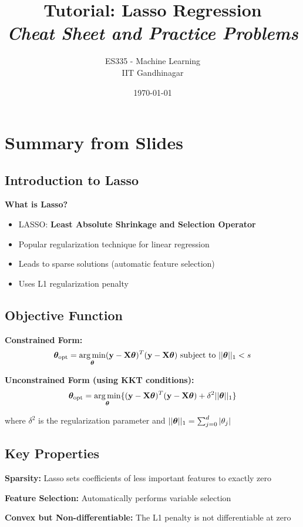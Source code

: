 \documentclass{article}
\title{\textbf{Tutorial: Lasso Regression} \\ \textit{Cheat Sheet and Practice Problems}}
\author{ES335 - Machine Learning \\ IIT Gandhinagar}
\date{\today}
\begin{document}
\maketitle

\section{Summary from Slides}

\subsection{Introduction to Lasso}

\textbf{What is Lasso?}
\begin{itemize}
    \item LASSO: \textbf{Least Absolute Shrinkage and Selection Operator}
    \item Popular regularization technique for linear regression
    \item Leads to sparse solutions (automatic feature selection)
    \item Uses L1 regularization penalty
\end{itemize}

\subsection{Objective Function}

\textbf{Constrained Form:}
$$\boldsymbol{\theta}_{\text{opt}} = \operatorname*{arg\,min}_{\boldsymbol{\theta}} (\mathbf{y} - \mathbf{X}\boldsymbol{\theta})^T(\mathbf{y} - \mathbf{X}\boldsymbol{\theta}) \text{ subject to } ||\boldsymbol{\theta}||_1 < s$$

\textbf{Unconstrained Form (using KKT conditions):}
$$\boldsymbol{\theta}_{\text{opt}} = \operatorname*{arg\,min}_{\boldsymbol{\theta}} \{(\mathbf{y} - \mathbf{X}\boldsymbol{\theta})^T(\mathbf{y} - \mathbf{X}\boldsymbol{\theta}) + \delta^2||\boldsymbol{\theta}||_1\}$$

where $\delta^2$ is the regularization parameter and $||\boldsymbol{\theta}||_1 = \sum_{j=0}^d |\theta_j|$

\subsection{Key Properties}

\textbf{Sparsity:} Lasso sets coefficients of less important features to exactly zero

\textbf{Feature Selection:} Automatically performs variable selection

\textbf{Convex but Non-differentiable:} The L1 penalty is not differentiable at zero
\end{document}
